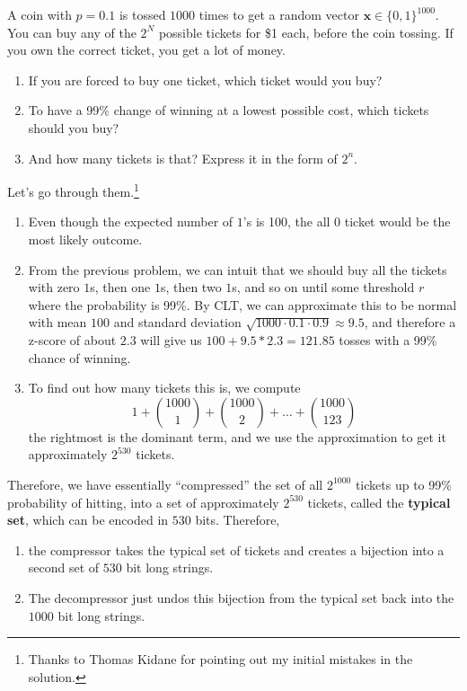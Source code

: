 \documentclass{article}
\begin{document}
    \begin{exercise}
      A coin with $p = 0.1$ is tossed $1000$ times to get a random vector $\mathbf{x} \in \{0, 1\}^{1000}$. You can buy any of the $2^N$ possible tickets for \$1 each, before the coin tossing. If you own the correct ticket, you get a lot of money. 
      \begin{enumerate}
        \item If you are forced to buy one ticket, which ticket would you buy? 
        \item To have a 99\% change of winning at a lowest possible cost, which tickets should you buy? 
        \item And how many tickets is that? Express it in the form of $2^n$. 
      \end{enumerate}
    \end{exercise}
    \begin{solution}
      Let's go through them.\footnote{Thanks to Thomas Kidane for pointing out my initial mistakes in the solution.}
      \begin{enumerate}
        \item Even though the expected number of $1$'s is 100, the all $0$ ticket would be the most likely outcome. 
        \item From the previous problem, we can intuit that we should buy all the tickets with zero $1$s, then one $1$s, then two $1$s, and so on until some threshold $r$ where the probability is 99\%. By CLT, we can approximate this to be normal with mean $100$ and standard deviation $\sqrt{1000 \cdot 0.1 \cdot 0.9} \approx 9.5$, and therefore a z-score of about $2.3$ will give us $100 + 9.5 * 2.3 = 121.85$ tosses with a 99\% chance of winning. 
        \item To find out how many tickets this is, we compute 
          \begin{equation}
            1 + \binom{1000}{1} + \binom{1000}{2} + \ldots + \binom{1000}{123}
          \end{equation}
          the rightmost is the dominant term, and we use the approximation to get it approximately $2^{530}$ tickets.  
      \end{enumerate}
    \end{solution}

    Therefore, we have essentially ``compressed'' the set of all $2^{1000}$ tickets up to 99\% probability of hitting, into a set of approximately $2^{530}$ tickets, called the \textbf{typical set}, which can be encoded in $530$ bits. Therefore, 
    \begin{enumerate}
      \item the compressor takes the typical set of tickets and creates a bijection into a second set of $530$ bit long strings. 
      \item The decompressor just undos this bijection from the typical set back into the $1000$ bit long strings. 
    \end{enumerate}
\end{document}
